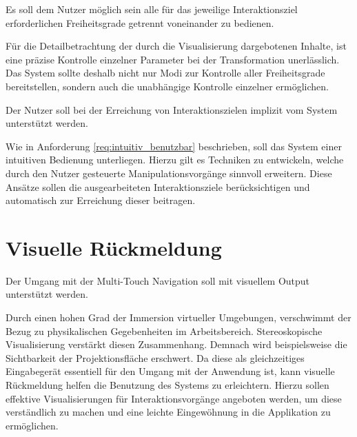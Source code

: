 	\begin{anforderung}
	\label{req:getrennte_bedienung_der_dof}
		Es soll dem Nutzer möglich sein alle für das jeweilige Interaktionsziel erforderlichen Freiheitsgrade getrennt voneinander zu bedienen.
	\end{anforderung}

Für die Detailbetrachtung der durch die Visualisierung dargebotenen Inhalte, ist eine präzise Kontrolle einzelner Parameter bei der Transformation unerlässlich. Das System sollte deshalb nicht nur Modi zur Kontrolle aller Freiheitsgrade bereitstellen, sondern auch die unabhängige Kontrolle einzelner ermöglichen.

	\begin{anforderung}
	\label{req:implizite_kontrolle}
		Der Nutzer soll bei der Erreichung von Interaktionszielen implizit vom System unterstützt werden.
	\end{anforderung}

Wie in Anforderung \ref{req:intuitiv_benutzbar} beschrieben, soll das System einer intuitiven Bedienung unterliegen. Hierzu gilt es Techniken zu entwickeln, welche durch den Nutzer gesteuerte Manipulationsvorgänge sinnvoll erweitern. Diese Ansätze sollen die ausgearbeiteten Interaktionsziele berücksichtigen und automatisch zur Erreichung dieser beitragen.


\section{Visuelle Rückmeldung}
\label{sec:visuelle_rueckmeldung}

	\begin{anforderung}
	\label{req:visueller_output}
		Der Umgang mit der Multi-Touch Navigation soll mit visuellem Output unterstützt werden.
	\end{anforderung}

Durch einen hohen Grad der Immersion virtueller Umgebungen, verschwimmt der Bezug zu physikalischen Gegebenheiten im Arbeitsbereich. Stereoskopische Visualisierung verstärkt diesen Zusammenhang. Demnach wird beispielsweise die Sichtbarkeit der Projektionsfläche erschwert. Da diese als gleichzeitiges Eingabegerät essentiell für den Umgang mit der Anwendung ist, kann visuelle Rückmeldung helfen die Benutzung des Systems zu erleichtern. Hierzu sollen effektive Visualisierungen für Interaktionsvorgänge angeboten werden, um diese verständlich zu machen und eine leichte Eingewöhnung in die Applikation zu ermöglichen.

